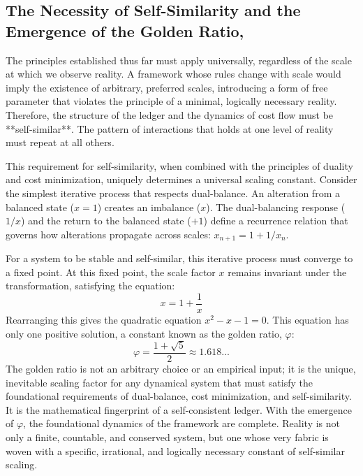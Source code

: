 \documentclass[11pt,a4paper]{article}
\begin{document}
\subsection{The Necessity of Self-Similarity and the Emergence of the Golden Ratio, }
The principles established thus far must apply universally, regardless of the scale at which we observe reality. A framework whose rules change with scale would imply the existence of arbitrary, preferred scales, introducing a form of free parameter that violates the principle of a minimal, logically necessary reality. Therefore, the structure of the ledger and the dynamics of cost flow must be **self-similar**. The pattern of interactions that holds at one level of reality must repeat at all others.

This requirement for self-similarity, when combined with the principles of duality and cost minimization, uniquely determines a universal scaling constant. Consider the simplest iterative process that respects dual-balance. An alteration from a balanced state (\(x=1\)) creates an imbalance (\(x\)). The dual-balancing response (\(1/x\)) and the return to the balanced state (\(+1\)) define a recurrence relation that governs how alterations propagate across scales: \(x_{n+1} = 1 + 1/x_n\).

For a system to be stable and self-similar, this iterative process must converge to a fixed point. At this fixed point, the scale factor \(x\) remains invariant under the transformation, satisfying the equation:
\begin{equation}
x = 1 + \frac{1}{x}
\end{equation}
Rearranging this gives the quadratic equation \(x^2 - x - 1 = 0\). This equation has only one positive solution, a constant known as the golden ratio, \(\varphi\):
\begin{equation}
\varphi = \frac{1 + \sqrt{5}}{2} \approx 1.618...
\end{equation}
The golden ratio is not an arbitrary choice or an empirical input; it is the unique, inevitable scaling factor for any dynamical system that must satisfy the foundational requirements of dual-balance, cost minimization, and self-similarity. It is the mathematical fingerprint of a self-consistent ledger. With the emergence of \(\varphi\), the foundational dynamics of the framework are complete. Reality is not only a finite, countable, and conserved system, but one whose very fabric is woven with a specific, irrational, and logically necessary constant of self-similar scaling.
\end{document}

